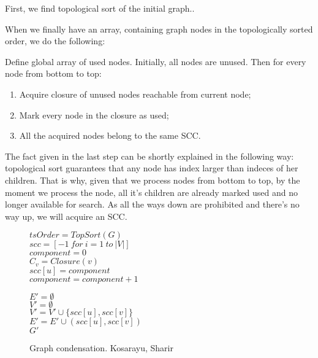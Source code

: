 First, we find topological sort of the initial graph..

When we finally have an array, containing graph nodes in the topologically sorted order, we do the following:

Define global array of used nodes. Initially, all nodes are unused.
Then for every node from bottom to top:
\begin{enumerate}
	\item Acquire closure of unused nodes reachable from current node; 
	\item Mark every node in the closure as used;
	\item All the acquired nodes belong to the same SCC.
\end{enumerate}

The fact given in the last step can be shortly explained in the following way:
topological sort guarantees that any node has index larger than indeces of her children.
That is why, given that we process nodes from bottom to top, by the moment we process the node, all it's children are already marked used and no longer available for search.
As all the ways down are prohibited and there's no way up, we will acquire an SCC.

\begin{figure}[H]
	\begin{center}
		\begin{algorithm}[H]
			\SetAlgoLined
			$tsOrder = TopSort(G)$ \\
			$scc = [-1\ for\ i = 1\ to\ |V|] $ \\ 
			$component = 0$ \\
			 {
				 {
					$C_v = Closure(v)$ \\
					 {
						$scc[u] = component$ \\
					}
					$component = component + 1$ \\
				}
			}
			
			$E' = \emptyset$ \\
			$V' = \emptyset$ \\
			 {
				 {
					$V' = V' \cup \{scc[u], scc[v]\}$ \\ 
					$E' = E' \cup (scc[u], scc[v])$ \\ 
				}
			}
			\Return $G'$
			\label{alg:condensation}
			\caption{Graph condensation. Kosarayu, Sharir}
		\end{algorithm}
	\end{center}
\end{figure}

